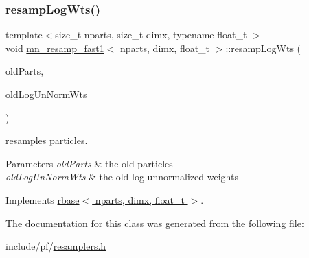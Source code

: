 \subsubsection{\texorpdfstring{resamp\+Log\+Wts()}{resampLogWts()}}
{\footnotesize\ttfamily template$<$size\+\_\+t nparts, size\+\_\+t dimx, typename float\+\_\+t $>$ \\
void \hyperlink{classmn__resamp__fast1}{mn\+\_\+resamp\+\_\+fast1}$<$ nparts, dimx, float\+\_\+t $>$\+::resamp\+Log\+Wts (\begin{DoxyParamCaption}\item[{\hyperlink{classrbase_aa12fc826befa6ba0647b5f59ebc396ee}{array\+Vec} \&}]{old\+Parts,  }\item[{\hyperlink{classrbase_a6f76bef853e508cb5b6f546d231b06f5}{array\+Float} \&}]{old\+Log\+Un\+Norm\+Wts }\end{DoxyParamCaption})\hspace{0.3cm}{\ttfamily [virtual]}}



resamples particles. 


\begin{DoxyParams}{Parameters}
{\em old\+Parts} & the old particles \\
\hline
{\em old\+Log\+Un\+Norm\+Wts} & the old log unnormalized weights \\
\hline
\end{DoxyParams}


Implements \hyperlink{classrbase_aff0f6f88fd4656e67f5ebc870f10dd44}{rbase$<$ nparts, dimx, float\+\_\+t $>$}.



The documentation for this class was generated from the following file\+:\begin{DoxyCompactItemize}
\item 
include/pf/\hyperlink{resamplers_8h}{resamplers.\+h}\end{DoxyCompactItemize}
